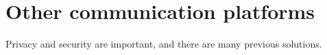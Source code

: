 \section{Other communication platforms}

Privacy and security are important, and there are many previous solutions.